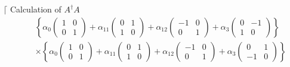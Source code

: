 \documentclass[aps,preprint]{revtex4}
\begin{document}
$\lceil $ Calculation of $A^{\dagger }A$ 
\begin{eqnarray}
&&\left\{ \alpha _{0}\left( 
\begin{array}{cc}
1 & 0 \\ 
0 & 1%
\end{array}%
\right) +\alpha _{11}\left( 
\begin{array}{cc}
0 & 1 \\ 
1 & 0%
\end{array}%
\right) +\alpha _{12}\left( 
\begin{array}{cc}
-1 & 0 \\ 
0 & 1%
\end{array}%
\right) +\alpha _{3}\left( 
\begin{array}{cc}
0 & -1 \\ 
1 & 0%
\end{array}%
\right) \right\} \\
&&\times \left\{ \alpha _{0}\left( 
\begin{array}{cc}
1 & 0 \\ 
0 & 1%
\end{array}%
\right) +\alpha _{11}\left( 
\begin{array}{cc}
0 & 1 \\ 
1 & 0%
\end{array}%
\right) +\alpha _{12}\left( 
\begin{array}{cc}
-1 & 0 \\ 
0 & 1%
\end{array}%
\right) +\alpha _{3}\left( 
\begin{array}{cc}
0 & 1 \\ 
-1 & 0%
\end{array}%
\right) \right\}
\end{eqnarray}%
\end{document}
